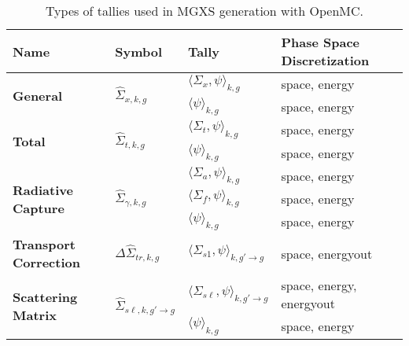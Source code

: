 \begin{table}[h!]
  \centering
  \caption[Tally types for MGXS generation]{Types of tallies used in MGXS generation with OpenMC.}
  \scriptsize
  \label{tab:tally-types}
  \vspace{6pt}
  \begin{tabular}{ m{1.5cm} m{1.2cm} m{2cm} l}
  \toprule
  {\bf Name} &
  {\bf Symbol} &
  {\bf Tally} &
  {\bf Phase Space Discretization} \\

  \midrule

  \multirow{2}{*}{\bf General} & \multirow{2}{*}{$\hat{\Sigma}_{x,k,g}$} & $\langle \Sigma_{x}, \psi \rangle_{k,g}$ & space, energy \\
  \cline{3-4}
  & & $\langle \psi \rangle_{k,g}$ & space, energy \\

  \midrule

  \multirow{2}{*}{\bf Total} & \multirow{2}{*}{$\hat{\Sigma}_{t,k,g}$} & $\langle \Sigma_{t}, \psi \rangle_{k,g}$ & space, energy \\
  \cline{3-4}
  & & $\langle \psi \rangle_{k,g}$ & space, energy \\

  \midrule

  \multirow{3}{*}{\parbox{1.5cm}{\bf Radiative Capture}} & \multirow{3}{*}{$\hat{\Sigma}_{\gamma,k,g}$} & $\langle \Sigma_{a}, \psi \rangle_{k,g}$ & space, energy \\
  \cline{3-4}
  & & $\langle \Sigma_{f}, \psi \rangle_{k,g}$ & space, energy \\
  \cline{3-4}
  & & $\langle \psi \rangle_{k,g}$ & space, energy \\

  \midrule

  \textbf{\parbox{1.5cm}{\bf Transport Correction}} & $\Delta\hat{\Sigma}_{tr,k,g}$ & $\langle \Sigma_{s1}, \psi \rangle_{k,g'\rightarrow g}$ & space, energyout \\

  \midrule

  \multirow{2}{*}{\parbox{1.5cm}{\bf Scattering Matrix}} & \multirow{2}{*}{$\hat{\Sigma}_{s\ell,k,g'\rightarrow g}$} & $\langle \Sigma_{s\ell}, \psi \rangle_{k,g'\rightarrow g}$ & space, energy, energyout \\
  \cline{3-4}
  & & $\langle \psi \rangle_{k,g}$ & space, energy \\

  \midrule


\end{tabular}
\end{table}

